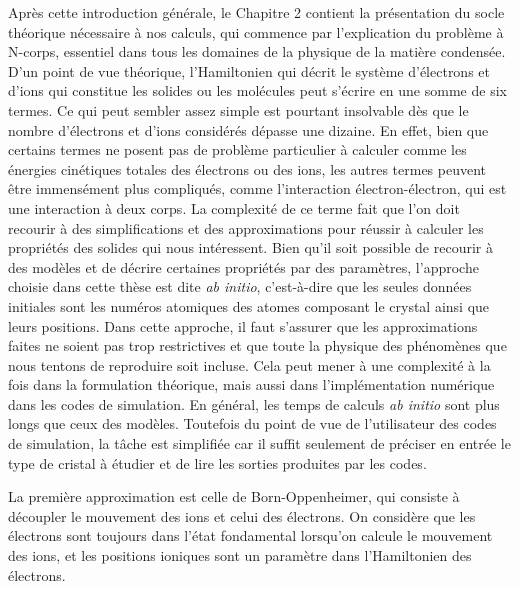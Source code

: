 %
%
Après cette introduction générale, le Chapitre 2 contient la présentation du socle théorique nécessaire à nos calculs, qui commence par l'explication du problème à N-corps, essentiel dans tous les domaines de la physique de la matière condensée. D'un point de vue théorique, l'Hamiltonien qui décrit le système d'électrons et d'ions qui constitue les solides ou les molécules peut s'écrire en une somme de six termes. Ce qui peut sembler assez simple est pourtant insolvable dès que le nombre d'électrons et d'ions considérés dépasse une dizaine. En effet, bien que certains termes ne posent pas de problème particulier à calculer comme les énergies cinétiques totales des électrons ou des ions, les autres termes peuvent être immensément plus compliqués, comme l'interaction électron-électron, qui est une interaction à deux corps. La complexité de ce terme fait que l'on doit recourir à des simplifications et des approximations pour réussir à calculer les propriétés des solides qui nous intéressent. Bien qu'il soit possible de recourir à des modèles et de décrire certaines propriétés par des paramètres, l'approche choisie dans cette thèse est dite \textit{ab initio}, c'est-à-dire que les seules données initiales sont les numéros atomiques des atomes composant le crystal ainsi que leurs positions. Dans cette approche, il faut s'assurer que les approximations faites ne soient pas trop restrictives et que toute la physique des phénomènes que nous tentons de reproduire soit incluse. Cela peut mener à une complexité à la fois dans la formulation théorique, mais aussi dans l'implémentation numérique dans les codes de simulation. En général, les temps de calculs \textit{ab initio} sont plus longs que ceux des modèles. Toutefois du point de vue de l'utilisateur des codes de simulation, la tâche est simplifiée car il suffit seulement de préciser en entrée le type de cristal à étudier et de lire les sorties produites par les codes. 

La première approximation est celle de Born-Oppenheimer, qui consiste à découpler le mouvement des ions et celui des électrons. On considère que les électrons sont toujours dans l'état fondamental lorsqu'on calcule le mouvement des ions, et les positions ioniques sont un paramètre dans l'Hamiltonien des électrons.

